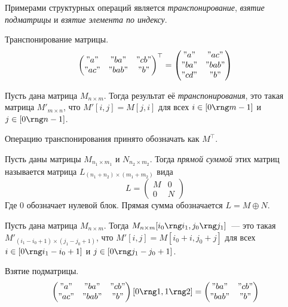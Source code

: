 Примерами структурных операций является \emph{транспонирование}, \emph{взятие подматрицы} и \emph{взятие элемента по индексу}.

\begin{example}
    Транспонирование матрицы.
    \[
        \begin{pmatrix}
            "a"  & "ba"  & "cb" \\
            "ac" & "bab" & "b"
        \end{pmatrix}^\top =
        \begin{pmatrix}
            "a"  & "ac"  \\
            "ba" & "bab" \\
            "cd" & "b"
        \end{pmatrix}
    \]
\end{example}

\begin{definition}
    Пусть дана матрица $M_{n \times m}$.
    Тогда результат её \emph{транспонирования}, это такая матрица $M'_{m \times n}$, что $M'[i,j] = M[j,i]$ для всех $i \in [0 \rng m - 1]$ и $j \in [0 \rng n - 1]$.

    Операцию транспонирования принято обозначать как $M^\top$.
\end{definition}

\begin{definition}
    Пусть даны матрицы $M_{n_1 \times m_1}$ и $N_{n_2 \times m_2}$.
    Тогда \emph{прямой суммой} этих матриц называется матрица $L_{(n_1 + n_2) \times (m_1 + m_2)}$ вида
    \[
        L =
        \begin{pmatrix}
            M & 0 \\
            0 & N
        \end{pmatrix}
    \]
    Где 0 обозначает нулевой блок. Прямая сумма обозначается $L = M \oplus N$.
\end{definition}

\begin{definition}
    Пусть дана матрица $M_{n\times m}$.
    Тогда $M_{n \times m}[i_0 \rng i_1, j_0 \rng j_1]$~--- это такая $M'_{(i_1 - i_0 + 1) \times (j_1 - j_0 + 1)}$, что $M'[i, j] = M[i_0 + i, j_0 + j]$ для всех $i \in [0 \rng i_1 - i_0 + 1]$ и $j \in [0 \rng j_1 - j_0 + 1]$.
\end{definition}

\begin{example}
    Взятие подматрицы.
    \begin{multline*}
        \begin{pmatrix}
            "a"  & "ba"  & "cb" \\
            "ac" & "bab" & "b"
        \end{pmatrix} [0 \rng 1, 1 \rng 2] =
        \begin{pmatrix}
            "ba"  & "cb" \\
            "bab" & "b"
        \end{pmatrix}
    \end{multline*}
\end{example}

